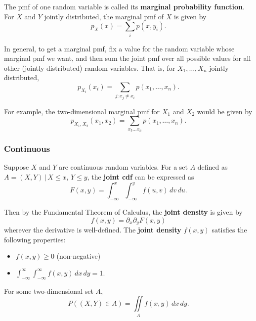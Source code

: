 \documentclass[a4paper,10pt]{article}
\begin{document}
The pmf of one random variable is called its \textbf{marginal probability function}. For $X$ and $Y$ jointly distributed, the marginal pmf of $X$ is given by 
\begin{equation*}
    p_X(x) = \sum_i p(x, y_i).
\end{equation*}

In general, to get a marginal pmf, fix a value for the random variable whose marginal pmf we want, and then sum the joint pmf over all possible values for all other (jointly distributed) random variables. That is, for $X_1, \ldots, X_n$ jointly distributed, 
\begin{equation*}
    p_{X_i}(x_i) = \sum_{j:x_j\neq x_i} p(x_1, \ldots, x_n).
\end{equation*}

For example, the two-dimensional marginal pmf for $X_1$ and $X_2$ would be given by 
\begin{equation*}
    p_{X_1, X_2}(x_1, x_2) = \sum_{x_3\ldots x_n} p(x_1, \ldots, x_n).
\end{equation*}

\subsubsection{Continuous}

Suppose $X$ and $Y$ are continuous random variables. For a set $A$ defined as $A={(X, Y)\,|\,X\leq x,\,Y\leq y}$, the \textbf{joint cdf} can be expressed as
\begin{equation*}
    F(x, y) = \int_{-\infty}^x \int_{-\infty}^y f(u, v)\,dv\,du.
\end{equation*}

Then by the Fundamental Theorem of Calculus, the \textbf{joint density} is given by 
\begin{equation*}
    f(x, y) = \partial_x\partial_y F(x, y)
\end{equation*}
wherever the derivative is well-defined. The \textbf{joint density} $f(x, y)$ satisfies the following properties:
\begin{itemize}
    \item $f(x, y) \geq 0$ (non-negative)
    \item $\displaystyle \int_{-\infty}^{\infty}\int_{-\infty}^{\infty}f(x, y) \,dx\,dy = 1$.
\end{itemize}

For some two-dimensional set $A$, 
\begin{equation*}
    P((X, Y) \in A) = \iint \limits_A f(x, y) \,dx\,dy.
\end{equation*}
\end{document}
